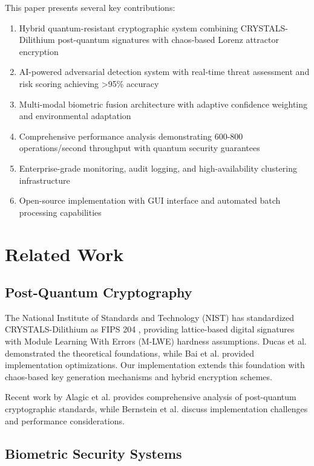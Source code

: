 \documentclass[12pt,a4paper]{article}
\begin{document}
This paper presents several key contributions:

\begin{enumerate}
    \item Hybrid quantum-resistant cryptographic system combining CRYSTALS-Dilithium post-quantum signatures with chaos-based Lorenz attractor encryption
    \item AI-powered adversarial detection system with real-time threat assessment and risk scoring achieving >95\% accuracy
    \item Multi-modal biometric fusion architecture with adaptive confidence weighting and environmental adaptation
    \item Comprehensive performance analysis demonstrating 600-800 operations/second throughput with quantum security guarantees
    \item Enterprise-grade monitoring, audit logging, and high-availability clustering infrastructure
    \item Open-source implementation with GUI interface and automated batch processing capabilities
\end{enumerate}

\section{Related Work}

\subsection{Post-Quantum Cryptography}

The National Institute of Standards and Technology (NIST) has standardized CRYSTALS-Dilithium as FIPS 204 \cite{nist2022fips204}, providing lattice-based digital signatures with Module Learning With Errors (M-LWE) hardness assumptions. Ducas et al. \cite{ducas2018crystals} demonstrated the theoretical foundations, while Bai et al. \cite{bai2021crystals} provided implementation optimizations. Our implementation extends this foundation with chaos-based key generation mechanisms and hybrid encryption schemes.

Recent work by Alagic et al. \cite{alagic2022status} provides comprehensive analysis of post-quantum cryptographic standards, while Bernstein et al. \cite{bernstein2017post} discuss implementation challenges and performance considerations.

\subsection{Biometric Security Systems}
\end{document}
